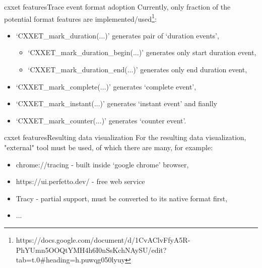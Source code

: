 \documentclass[aspectratio=169]{beamer}
\begin{document}
\begin{frame}{cxxet features}{Trace event format adoption}
    Currently, only fraction of the potential format features are implemented/used\footnote{https://docs.google.com/document/d/1CvAClvFfyA5R-PhYUmn5OOQtYMH4h6I0nSsKchNAySU/edit?tab=t.0\#heading=h.puwqg050lyuy}:

    \begin{itemize}
        \item `CXXET\_mark\_duration(...)' generates pair of `duration events',
        \begin{itemize}
            \item `CXXET\_mark\_duration\_begin(...)' generates only start duration event,
            \item `CXXET\_mark\_duration\_end(...)' generates only end duration event,
        \end{itemize}
        \item `CXXET\_mark\_complete(...)' generates `complete event',
        \item `CXXET\_mark\_instant(...)' generates `instant event' and fianlly
        \item `CXXET\_mark\_counter(...)' generates `counter event'.
    \end{itemize}

\end{frame}

\begin{frame}{cxxet features}{Resulting data visualization}
    For the resulting data visualization, "external" tool must be used, of which there are many, for example:

    \begin{itemize}
        \item chrome://tracing - built inside `google chrome' browser,
        \item https://ui.perfetto.dev/ - free web service
        \item Tracy - partial support, must be converted to its native format first,
        \item ...
    \end{itemize}

\end{frame}
\end{document}
